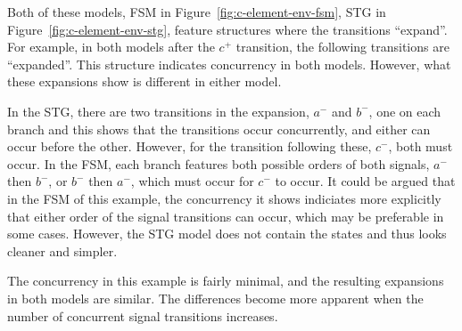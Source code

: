 Both of these models, FSM in Figure~\ref{fig:c-element-env-fsm}, STG in Figure~\ref{fig:c-element-env-stg}, feature structures 
where the transitions ``expand''. For example, in both models after the $c^{+}$ transition, the following transitions are ``expanded''. 
This structure indicates concurrency in both models. However, what these expansions show is different in either model. 

In the STG, there are two transitions in the expansion, $a^{-}$ and $b^{-}$, one on each branch and this shows that the transitions
 occur concurrently, and either can occur before the other. However, for the transition following these, $c^{-}$, both must occur.
In the FSM, each branch features both possible orders of both signals, $a^{-}$ then $b^{-}$, or $b^{-}$ then $a^{-}$, which must occur
for $c^{-}$ to occur. It could be argued that in the FSM of this example, the concurrency it shows indiciates more explicitly that either order of the
signal transitions can occur, which may be preferable in some cases. However, the STG model does not contain the states and thus looks
cleaner and simpler.

The concurrency in this example is fairly minimal, and the resulting expansions in both models are
similar. The differences become more apparent when the number of concurrent signal transitions increases. 
 
